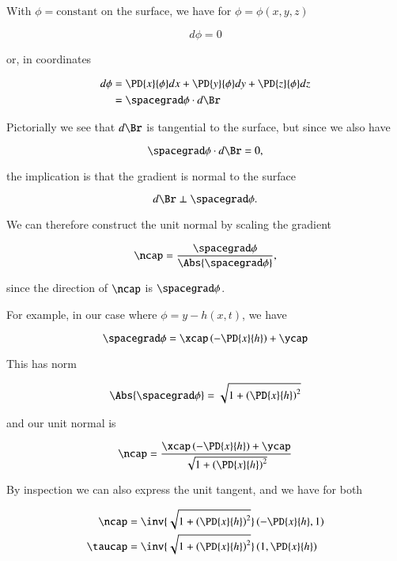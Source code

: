 
With $\phi = \text{constant}$ on the surface, we have for $\phi = \phi(x, y, z)$

\begin{equation}\label{eqn:continuumL13:240}
d\phi = 0 
\end{equation}

or, in coordinates

\begin{align*}
d\phi &= 
\PD{x}{\phi} dx
+\PD{y}{\phi} dy
+\PD{z}{\phi} dz \\
&= \spacegrad \phi \cdot d\Br
\end{align*}

Pictorially we see that $d\Br$ is tangential to the surface, but since we also have

\begin{equation}\label{eqn:continuumL13:360}
\spacegrad \phi \cdot d\Br = 0,
\end{equation}

the implication is that the gradient is normal to the surface

\begin{equation}\label{eqn:continuumL13:380}
d\Br \perp \spacegrad \phi.
\end{equation}

We can therefore construct the unit normal by scaling the gradient

\begin{equation}\label{eqn:continuumL13:260}
\ncap = \frac{\spacegrad \phi}{\Abs{\spacegrad \phi}},
\end{equation}

since the direction of $\ncap$ is $\spacegrad \phi$.

For example, in our case where $\phi = y - h(x, t)$, we have

\begin{equation}\label{eqn:continuumL13:280}
\spacegrad \phi = \xcap \left( -\PD{x}{h} \right) + \ycap
\end{equation}

This has norm

\begin{equation}\label{eqn:continuumL13:300}
\Abs{\spacegrad \phi} = \sqrt{ 1 + \left( \PD{x}{h} \right)^2 }
\end{equation}

and our unit normal is

\begin{equation}\label{eqn:continuumL13:320}
\ncap = 
\frac{\xcap \left( -\PD{x}{h} \right) + \ycap}{
\sqrt{ 1 + \left( \PD{x}{h} \right)^2 }
}
\end{equation}

By inspection we can also express the unit tangent, and we have for both

\begin{align}\label{eqn:continuumL13:340}
\ncap &= 
\inv{
\sqrt{ 1 + \left( \PD{x}{h} \right)^2 }
}
\left( -\PD{x}{h}, 1 \right)  \\
\taucap &= 
\inv{
\sqrt{ 1 + \left( \PD{x}{h} \right)^2 }
}
\left( 1, \PD{x}{h} \right)
\end{align}
